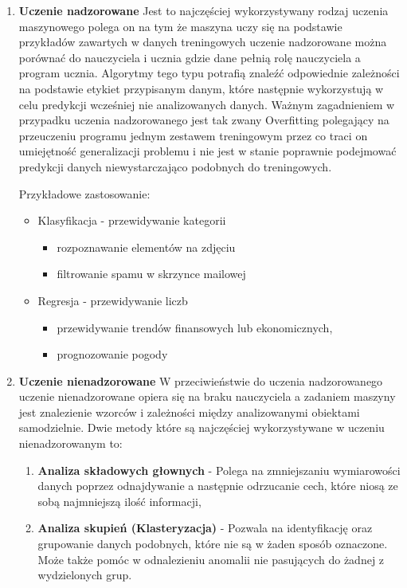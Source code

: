 \begin{enumerate}
    \item \textbf{Uczenie nadzorowane}
    Jest to najczęściej wykorzystywany rodzaj uczenia maszynowego polega on na tym 
    że maszyna uczy się na podstawie przykładów zawartych w danych treningowych 
    uczenie nadzorowane można porównać do nauczyciela i ucznia gdzie dane pełnią rolę nauczyciela 
    a program ucznia. Algorytmy tego typu potrafią znaleźć odpowiednie zależności na podstawie
    etykiet przypisanym danym,
    które następnie wykorzystują w celu predykcji wcześniej nie analizowanych danych.
    Ważnym zagadnieniem w przypadku uczenia nadzorowanego jest tak zwany Overfitting polegający 
    na przeuczeniu programu jednym zestawem treningowym przez co traci on umiejętność generalizacji problemu
    i nie jest w stanie poprawnie podejmować predykcji danych niewystarczająco podobnych
    do treningowych.

    Przykładowe zastosowanie:
    \begin{itemize}
        \item Klasyfikacja - przewidywanie kategorii
        \begin{itemize}
            \item rozpoznawanie elementów na zdjęciu
            \item filtrowanie spamu w skrzynce mailowej
        \end{itemize}
        \item Regresja - przewidywanie liczb
        \begin{itemize}
            \item przewidywanie trendów finansowych lub ekonomicznych,
            \item prognozowanie pogody
        \end{itemize}
    \end{itemize}
    \item \textbf{Uczenie nienadzorowane}
    W przeciwieństwie do uczenia nadzorowanego uczenie nienadzorowane opiera się na braku
    nauczyciela a zadaniem maszyny jest znalezienie wzorców i zależności między analizowanymi
    obiektami samodzielnie. Dwie metody które są najczęściej wykorzystywane w uczeniu nienadzorowanym
    to:
    \begin{enumerate}
        \item \textbf{Analiza składowych głownych} - Polega na zmniejszaniu wymiarowości danych poprzez
        odnajdywanie a następnie odrzucanie cech, które niosą ze sobą najmniejszą ilość informacji,
        \item \textbf{Analiza skupień (Klasteryzacja)} - Pozwala na identyfikację oraz grupowanie danych
        podobnych, które nie są w żaden sposób oznaczone. Może także pomóc w odnalezieniu anomalii
        nie pasujących do żadnej z wydzielonych grup.
        

\end{enumerate}
\end{enumerate}
